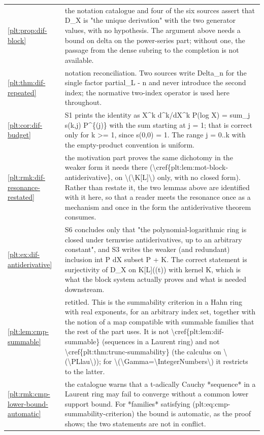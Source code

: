 \documentclass[11pt,oneside]{article}
\theoremstyle{plain}
\theoremstyle{definition}
\theoremstyle{remark}
\begin{document}
\begin{longtable}{@{}p{} p{}@{}}
\cref{plt:prop:dif-block} & the notation catalogue and four of the six sources assert that D\_X is "the unique derivation" with the two generator values, with no hypothesis. The argument above needs a bound on delta on the power-series part; without one, the passage from the dense subring to the completion is not available.\\
\cref{plt:thm:dif-repeated} & notation reconciliation. Two sources write Delta\_n for the single factor partial\_L - n and never introduce the second index; the normative two-index operator is used here throughout.\\
\cref{plt:cor:dif-budget} & S1 prints the identity as X\textasciicircum k d\textasciicircum k/dX\textasciicircum k P(log X) = sum\_j s(k,j) P\textasciicircum \{(j)\} with the sum starting at j = 1; that is correct only for k >= 1, since s(0,0) = 1. The range j = 0..k with the empty-product convention is uniform.\\
\cref{plt:rmk:dif-resonance-restated} & the motivation part proves the same dichotomy in the weaker form it needs there (\textbackslash cref\{plt:lem:mot-block-antiderivative\}, on \textbackslash (\textbackslash K[L]\textbackslash ) only, with no closed form). Rather than restate it, the two lemmas above are identified with it here, so that a reader meets the resonance once as a mechanism and once in the form the antiderivative theorem consumes.\\
\cref{plt:ex:dif-antiderivative} & S6 concludes only that "the polynomial-logarithmic ring is closed under termwise antiderivatives, up to an arbitrary constant", and S3 writes the weaker (and redundant) inclusion int P dX subset P + K. The correct statement is surjectivity of D\_X on K[L]((t)) with kernel K, which is what the block system actually proves and what is needed downstream.\\
\cref{plt:lem:cmp-summable} & retitled. This is the summability criterion in a Hahn ring with real exponents, for an arbitrary index set, together with the notion of a map compatible with summable families that the rest of the part uses. It is not \textbackslash cref\{plt:lem:dif-summable\} (sequences in a Laurent ring) and not \textbackslash cref\{plt:thm:trunc-summability\} (the calculus on \textbackslash (\textbackslash PLlau\textbackslash )); for \textbackslash (\textbackslash Gamma=\textbackslash IntegerNumbers\textbackslash ) it restricts to the latter.\\
\cref{plt:rmk:cmp-lower-bound-automatic} & the catalogue warns that a t-adically Cauchy *sequence* in a Laurent ring may fail to converge without a common lower support bound. For *families* satisfying (plt:eq:cmp-summability-criterion) the bound is automatic, as the proof shows; the two statements are not in conflict.\\

\end{longtable}
\end{document}
